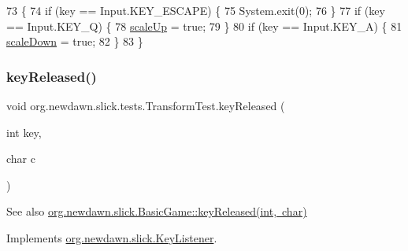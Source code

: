 \begin{DoxyCode}
73                                             \{
74         \textcolor{keywordflow}{if} (key == Input.KEY\_ESCAPE) \{
75             System.exit(0);
76         \}
77         \textcolor{keywordflow}{if} (key == Input.KEY\_Q) \{
78             \mbox{\hyperlink{classorg_1_1newdawn_1_1slick_1_1tests_1_1_transform_test_aae392ece0303e93157331a226863f789}{scaleUp}} = \textcolor{keyword}{true};
79         \}
80         \textcolor{keywordflow}{if} (key == Input.KEY\_A) \{
81             \mbox{\hyperlink{classorg_1_1newdawn_1_1slick_1_1tests_1_1_transform_test_a3f3abdb195eb3e8d3f94035370279110}{scaleDown}} = \textcolor{keyword}{true};
82         \}
83     \}
\end{DoxyCode}
\mbox{\label{classorg_1_1newdawn_1_1slick_1_1tests_1_1_transform_test_a418cf1065d117540939795dff77a226c}} 
\subsubsection{\texorpdfstring{key\+Released()}{keyReleased()}}
{\footnotesize\ttfamily void org.\+newdawn.\+slick.\+tests.\+Transform\+Test.\+key\+Released (\begin{DoxyParamCaption}\item[{int}]{key,  }\item[{char}]{c }\end{DoxyParamCaption})\hspace{0.3cm}{\ttfamily [inline]}}

\begin{DoxySeeAlso}{See also}
\mbox{\hyperlink{classorg_1_1newdawn_1_1slick_1_1_basic_game_ae8ce436f93206f0b251a0fbf2a345849}{org.\+newdawn.\+slick.\+Basic\+Game\+::key\+Released(int, char)}} 
\end{DoxySeeAlso}


Implements \mbox{\hyperlink{interfaceorg_1_1newdawn_1_1slick_1_1_key_listener_a474673b59bc77266bcef3c261c26ee2b}{org.\+newdawn.\+slick.\+Key\+Listener}}.


